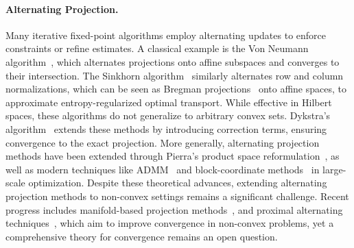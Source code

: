 \paragraph{Alternating Projection.} Many iterative fixed-point algorithms employ alternating updates to enforce constraints or refine estimates. A classical example is the Von Neumann algorithm~\cite{von1950functional}, which alternates projections onto affine subspaces and converges to their intersection. The Sinkhorn algorithm~\cite{sinkhorn1967concerning} similarly alternates row and column normalizations, which can be seen as Bregman projections~\cite{benamou2015iterative} onto affine spaces, to approximate entropy-regularized optimal transport. While effective in Hilbert spaces, these algorithms do not generalize to arbitrary convex sets. Dykstra’s algorithm~\cite{dykstra1983algorithm} extends these methods by introducing correction terms, ensuring convergence to the exact projection. More generally, alternating projection methods have been extended through Pierra’s product space reformulation~\cite{pierra1984decomposition}, as well as modern techniques like ADMM~\cite{boyd2011distributed} and block-coordinate methods~\cite{tibshirani2017dykstra} in large-scale optimization. Despite these theoretical advances, extending alternating projection methods to non-convex settings remains a significant challenge. Recent progress includes manifold-based projection methods~\cite{ lewis2008alternating}, and proximal alternating techniques~\cite{bolte2014proximal}, which aim to improve convergence in non-convex problems, yet a comprehensive theory for convergence remains an open question.

